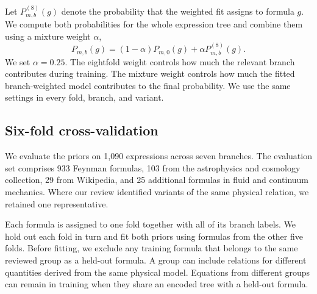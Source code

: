 \documentclass[10pt]{article}
\begin{document}
Let $P^{(8)}_{m,b}(g)$ denote the probability that the weighted fit assigns to formula $g$. We compute both probabilities for the whole expression tree and combine them using a mixture weight $\alpha$,
\begin{equation}
P_{m,b}(g)=(1-\alpha)P_{m,0}(g)+\alpha P^{(8)}_{m,b}(g).
\label{eq:branch-prior}
\end{equation}
We set $\alpha=0.25$. The eightfold weight controls how much the relevant branch contributes during training. The mixture weight controls how much the fitted branch-weighted model contributes to the final probability. We use the same settings in every fold, branch, and variant.

\subsection{Six-fold cross-validation}\label{sec:prior-evaluation}
We evaluate the priors on 1,090 expressions across seven branches. The evaluation set comprises 933 Feynman formulas, 103 from the astrophysics and cosmology collection, 29 from Wikipedia, and 25 additional formulas in fluid and continuum mechanics. Where our review identified variants of the same physical relation, we retained one representative.

Each formula is assigned to one fold together with all of its branch labels. We hold out each fold in turn and fit both priors using formulas from the other five folds. Before fitting, we exclude any training formula that belongs to the same reviewed group as a held-out formula. A group can include relations for different quantities derived from the same physical model. Equations from different groups can remain in training when they share an encoded tree with a held-out formula.
\end{document}
